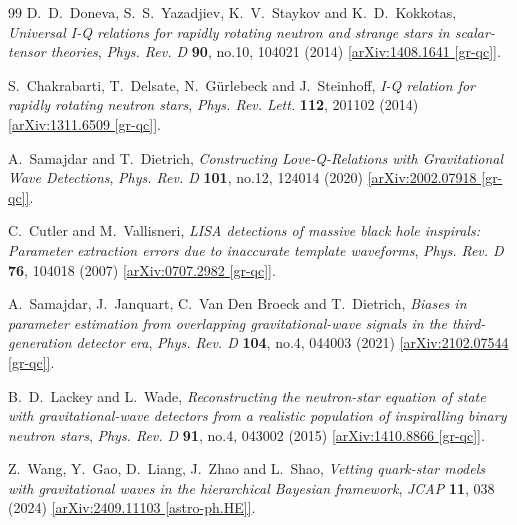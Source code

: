 \documentclass[11pt]{article}
\begin{document}
\begin{thebibliography}{99}
    D.~D.~Doneva, S.~S.~Yazadjiev, K.~V.~Staykov and K.~D.~Kokkotas,
    \emph{Universal I-Q relations for rapidly rotating neutron and strange stars in scalar-tensor theories},
    \emph{Phys. Rev. D} \textbf{90}, no.10, 104021 (2014) \href{https://arxiv.org/pdf/1408.1641}{[arXiv:1408.1641 [gr-qc]]}.

    S.~Chakrabarti, T.~Delsate, N.~G{\"u}rlebeck and J.~Steinhoff,
    \emph{I-Q relation for rapidly rotating neutron stars},
    \emph{Phys. Rev. Lett.} \textbf{112}, 201102 (2014)\href{https://arxiv.org/pdf/1311.6509}{[arXiv:1311.6509 [gr-qc]]}.

    A.~Samajdar and T.~Dietrich,
    \emph{Constructing Love-Q-Relations with Gravitational Wave Detections},
    \emph{Phys. Rev. D} \textbf{101}, no.12, 124014 (2020) \href{https://arxiv.org/pdf/2002.07918}{[arXiv:2002.07918 [gr-qc]]}.

    C.~Cutler and M.~Vallisneri,
    \emph{LISA detections of massive black hole inspirals: Parameter extraction errors due to inaccurate template waveforms},
    \emph{Phys. Rev. D} \textbf{76}, 104018 (2007) \href{https://arxiv.org/pdf/0707.2982}{[arXiv:0707.2982 [gr-qc]]}.

    A.~Samajdar, J.~Janquart, C.~Van Den Broeck and T.~Dietrich,
    \emph{Biases in parameter estimation from overlapping gravitational-wave signals in the third-generation detector era},
    \emph{Phys. Rev. D} \textbf{104}, no.4, 044003 (2021) \href{https://arxiv.org/pdf/2102.07544}{[arXiv:2102.07544 [gr-qc]]}.
    
    B.~D.~Lackey and L.~Wade,
    \emph{Reconstructing the neutron-star equation of state with gravitational-wave detectors from a realistic population of inspiralling binary neutron stars},
    \emph{Phys. Rev. D} \textbf{91}, no.4, 043002 (2015) \href{https://arxiv.org/pdf/1410.8866}{[arXiv:1410.8866 [gr-qc]]}.

    Z.~Wang, Y.~Gao, D.~Liang, J.~Zhao and L.~Shao,
    \emph{Vetting quark-star models with gravitational waves in the hierarchical Bayesian framework},
    \emph{JCAP} \textbf{11}, 038 (2024) \href{https://arxiv.org/pdf/2409.11103}{[arXiv:2409.11103 [astro-ph.HE]]}.
    
\end{thebibliography}
\end{document}
